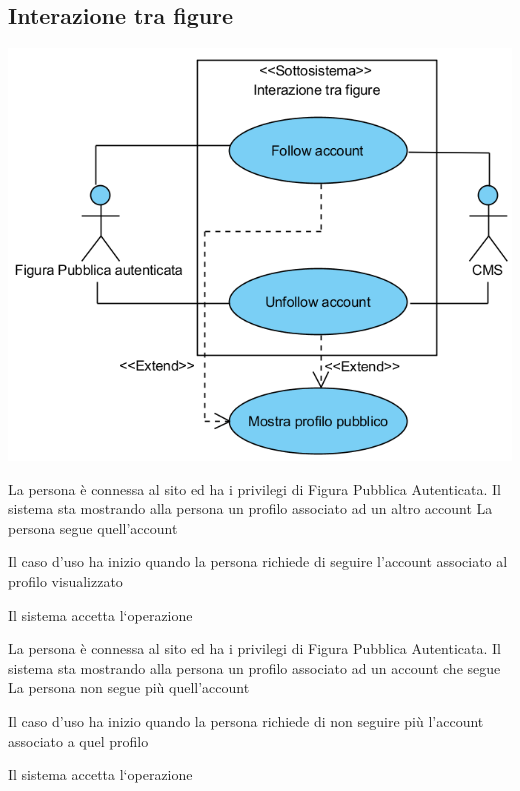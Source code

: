 \subsection{Interazione tra figure}
\begin{center}
   \includegraphics[width=\textwidth]{assets/visualParadigm/cu/InterazioneTraFigure}
\end{center}
{}
{La persona è connessa al sito ed ha i privilegi di Figura Pubblica Autenticata. Il sistema sta mostrando alla persona un profilo associato ad un altro account}
{La persona segue quell'account}
{\begin{enumCU}
	\item Il caso d'uso ha inizio quando la persona richiede di seguire l'account associato al profilo visualizzato
	\item Il sistema accetta l`operazione
\end{enumCU}}


{}
{La persona è connessa al sito ed ha i privilegi di Figura Pubblica Autenticata. Il sistema sta mostrando alla persona un profilo associato ad un account che segue}
{La persona non segue più quell'account}
{\begin{enumCU}
	\item Il caso d'uso ha inizio quando la persona richiede di non seguire più l'account associato a quel profilo
	\item Il sistema accetta l`operazione
\end{enumCU}}

